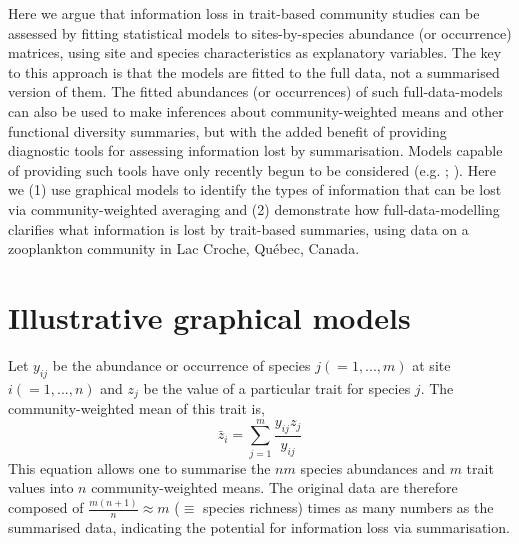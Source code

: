 \documentclass[12pt]{ecology}
\begin{document}
Here we argue that information loss in trait-based community studies can be assessed by fitting statistical models to sites-by-species abundance (or occurrence) matrices, using site and species characteristics as explanatory variables.  The key to this approach is that the models are fitted to the full data, not a summarised version of them.  The fitted abundances (or occurrences) of such full-data-models can also be used to make inferences about community-weighted means and other functional diversity summaries, but with the added benefit of providing diagnostic tools for assessing information lost by summarisation.  Models capable of providing such tools have only recently begun to be considered (e.g. ; ).  Here we (1) use graphical models to identify the types of information that can be lost via community-weighted averaging and (2) demonstrate how full-data-modelling clarifies what information is lost by trait-based summaries, using data on a zooplankton community in Lac Croche, Qu\'{e}bec, Canada.


\section{Illustrative graphical models}
\label{sec:graphmod}

Let $y_{ij}$ be the abundance or occurrence of species $j (= 1, ..., m)$ at site $i (= 1, ..., n)$ and $z_j$ be the value of a particular trait for species $j$.  The community-weighted mean of this trait is,
\begin{equation} 
\bar{z}_i = \sum_{j=1}^m \frac{y_{ij} z_j}{y_{ij}}
\label{eq:cwmdef}
\end{equation}
This equation allows one to summarise the $nm$ species abundances and $m$ trait values into $n$ community-weighted means.  The original data are therefore composed of $\frac{m(n + 1)}{n} \approx m$ ($\equiv$ species richness) times as many numbers as the summarised data, indicating the potential for information loss via summarisation.

\end{document}
